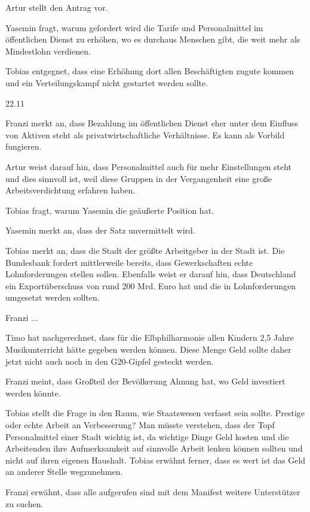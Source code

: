 \documentclass[ngerman,headheight=70pt]{scrartcl}
\begin{document}
    Artur stellt den Antrag vor.

    Yasemin fragt, warum gefordert wird die Tarife und Personalmittel im
    öffentlichen Dienst zu erhöhen, wo es durchaus Menschen gibt, die weit mehr
    als Mindestlohn verdienen.

    Tobias entgegnet, dass eine Erhöhung dort allen Beschäftigten zugute kommen
    und ein Verteilungskampf nicht gestartet werden sollte.

    22.11

    Franzi merkt an, dass Bezahlung im öffentlichen Dienst eher unter dem Einfluss
    von Aktiven steht als privatwirtschaftliche Verhältnisse. Es kann als Vorbild
    fungieren.

    Artur weist darauf hin, dass Personalmittel auch für mehr Einstellungen
    steht und dies sinnvoll ist, weil diese Gruppen in der Vergangenheit eine
    große Arbeitsverdichtung erfahren haben.

    Tobias fragt, warum Yasemin die geäußerte Position hat.

    Yasemin merkt an, dass der Satz unvermittelt wird.

    Tobias merkt an, dass die Stadt der größte Arbeitgeber in der Stadt ist.
    Die Bundesbank fordert mittlerweile bereits, dass Gewerkschaften echte
    Lohnforderungen stellen sollen. Ebenfalls weist er darauf hin, dass Deutschland
    ein Exportüberschuss von rund 200 Mrd. Euro hat und die in Lohnforderungen
    umgesetzt werden sollten.

    Franzi ...

    Timo hat nachgerechnet, dass für die Elbphilharmonie allen Kindern 2,5 Jahre
    Musikunterricht hätte gegeben werden können. Diese Menge Geld sollte daher
    jetzt nicht auch noch in den G20-Gipfel gesteckt werden.

    Franzi meint, dass Großteil der Bevölkerung Ahnung hat, wo Geld investiert
    werden könnte.

    Tobias stellt die Frage in den Raum, wie Staatswesen verfasst sein sollte.
    Prestige oder echte Arbeit an Verbesserung? Man müsste verstehen, dass
    der Topf Personalmittel einer Stadt wichtig ist, da wichtige Dinge Geld
    kosten und die Arbeitenden ihre Aufmerksamkeit auf sinnvolle Arbeit lenken
    können sollten und nicht auf ihren eigenen Haushalt.
    Tobias erwähnt ferner, dass es wert ist das Geld an anderer Stelle wegzunehmen.

    Franzi erwähnt, dass alle aufgerufen sind mit dem Manifest weitere Unterstützer
    zu suchen.
\end{document}
